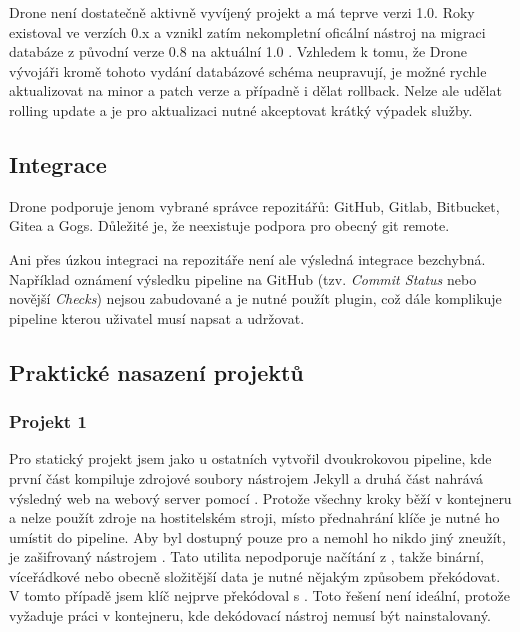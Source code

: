         Drone není dostatečně aktivně vyvíjený projekt a má teprve verzi 1.0. Roky existoval ve verzích 0.x a vznikl zatím nekompletní oficální nástroj na migraci databáze z původní verze 0.8 na aktuální 1.0 \cite{drone-mig}. Vzhledem k tomu, že Drone vývojáři kromě tohoto vydání databázové schéma neupravují, je možné rychle aktualizovat na minor a patch verze a případně i dělat rollback. Nelze ale udělat rolling update a je pro aktualizaci nutné akceptovat krátký výpadek služby.

    \subsection{Integrace}
        Drone podporuje jenom vybrané správce repozitářů: GitHub, Gitlab, Bitbucket, Gitea a Gogs. Důležité je, že neexistuje podpora pro obecný git remote.

        Ani přes úzkou integraci na repozitáře není ale výsledná integrace bezchybná. Například oznámení výsledku pipeline na GitHub (tzv. \textit{Commit Status} nebo novější \textit{Checks}) nejsou zabudované a je nutné použít plugin, což dále komplikuje pipeline kterou uživatel musí napsat a udržovat.


    \subsection{Praktické nasazení projektů}
        \subsubsection{Projekt 1}
            Pro statický projekt jsem jako u ostatních \CI vytvořil dvoukrokovou pipeline, kde první část kompiluje zdrojové soubory nástrojem Jekyll a druhá část nahrává výsledný web na webový server pomocí . Protože všechny kroky běží v kontejneru a nelze použít zdroje na hostitelském stroji, místo přednahrání  klíče je nutné ho umístit do pipeline. Aby byl dostupný pouze pro \CI a nemohl ho nikdo jiný zneužít, je zašifrovaný  nástrojem . Tato utilita nepodporuje načítání z , takže binární, víceřádkové nebo obecně složitější data je nutné nějakým způsobem překódovat. V tomto případě jsem klíč nejprve překódoval s . Toto řešení není ideální, protože vyžaduje práci v kontejneru, kde dekódovací nástroj nemusí být nainstalovaný.

